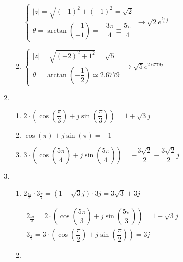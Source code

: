 \begin{enumerate}[label=\color{red}\textbf{\arabic*)}]
\begin{enumerate}[label=\color{red}\textbf{\textbf{\textbf{\alph*)}}}]
                $\begin{cases}
                    |z|=\sqrt{(-1)^2+(-1)^2}=\sqrt{2}\\
                    \theta=\arctan\left( \dfrac{-1}{-1}  \right) =-\dfrac{3\pi}{4}\equiv \dfrac{5\pi}{4}
                \end{cases}\longrightarrow \sqrt{2} e^{\frac{5\pi}{4} j} $
            \item {} 

                $\begin{cases}
                    |z|=\sqrt{(-2)^2+1^2}=\sqrt{5}\\
                    \theta=\arctan\left( -\dfrac{1}{2} \right) \simeq2.6779
                \end{cases}\longrightarrow \sqrt{5}e^{2.6779j}  $
        \end{enumerate}
    \item {}
        \begin{enumerate}[label=\color{red}\textbf{\textbf{\textbf{\alph*)}}}]
            \item {} 

            $2\cdot \left( \cos\left( \dfrac{\pi}{3} \right) +j\sin\left( \dfrac{\pi}{3} \right)  \right)=1+\sqrt{3} j $
            \item {} 

                $\cos(\pi)+j\sin(\pi)=-1$
            \item {} 

                $3\cdot \left( \cos\left( \dfrac{5\pi}{4} \right) +j\sin\left( \dfrac{5\pi}{4} \right)  \right)=-\dfrac{3\sqrt{2} }{2} -\dfrac{3\sqrt{2} }{2}j  $
        \end{enumerate}
    \item {}
        \begin{enumerate}[label=\color{red}\textbf{\textbf{\textbf{\alph*)}}}]
            \item {} 
                
                $2_{\frac{5\pi}{3} }\cdot 3_{\frac{\pi}{2} }=(1-\sqrt{3}j)\cdot 3j=3\sqrt{3} +3j $

                $\begin{array}{l}
                    2_{\frac{5\pi}{3} }=2\cdot \left( \cos\left( \dfrac{5\pi}{3} \right) +j\sin\left( \dfrac{5\pi}{3} \right)  \right) =1-\sqrt{3} j\\
                    3_{\frac{\pi}{2} }=3\cdot \left( \cos\left( \dfrac{\pi}{2} \right) +j\sin\left( \dfrac{\pi}{2} \right)  \right) =3j
                \end{array}$
            \item {} 


\end{enumerate}
\end{enumerate}
